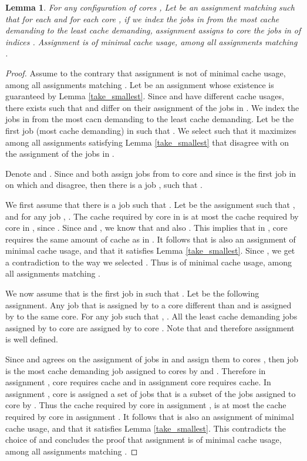 \documentclass[11pt]{article}
\newtheorem{lemma}[theorem]{Lemma}
\begin{document}
\begin{lemma}\label{by_order}
For any configuration of cores , Let  be an assignment matching  such that  for each  and for each core ,
if we index the jobs in  from the most cache demanding to the least cache demanding, assignment  assigns to core  the jobs in  of indices .
Assignment  is of minimal cache usage, among all assignments matching .
\end{lemma}
\begin{proof}
Assume to the contrary that assignment  is not of minimal cache usage, among all assignments matching .
Let  be an assignment whose existence is guaranteed by Lemma \ref{take_smallest}.
Since  and  have different cache usages, there exists  such that  and  differ on their assignment of the jobs in .
We index the jobs in  from the most cacn demanding to the least cache demanding.
Let  be the first job (most cache demanding) in  such that .
We select  such that it maximizes  among all assignments satisfying Lemma \ref{take_smallest} that disagree with  on the assignment of the jobs in .

Denote  and .
Since  and  both assign  jobs from  to core  and since  is the first job in  on which  and  disagree, then there is a job ,  such that .

We first assume that there is a job  such that .
Let  be the assignment such that ,  and for any job , .
The cache required by core  in  is at most the cache required by core  in , since .
Since  and , we know that  and also .
This implies that in , core  requires the same amount of cache as in .
It follows that  is also an assignment of minimal cache usage, and that it satisfies Lemma \ref{take_smallest}. Since , we get a contradiction to the way we selected .
Thus  is  of minimal cache usage, among all assignments matching .

We now assume that  is the first job in  such that .
Let  be the following assignment.
Any job that is assigned by  to a core different than  and  is assigned by  to the same core.
For any job  such that ,  .
All the  least cache demanding jobs assigned by  to core  are assigned by  to core .
Note that  and therefore assignment  is well defined.

Since  and  agrees on the assignment of jobs  in  and assign them to cores , then job  is the most cache demanding job assigned to cores  by  and .
Therefore in assignment , core  requires  cache and in assignment  core  requires  cache.
In assignment , core  is assigned a set of jobs that is a subset of the jobs assigned to core  by .
Thus the cache required by core  in assignment , is at most the cache required by core  in assignment .
It follows that  is also an assignment of minimal cache usage, and that it satisfies Lemma \ref{take_smallest}.
This contradicts the choice of  and concludes the proof that assignment  is of minimal cache usage, among all assignments matching .
\end{proof}
\end{document}

